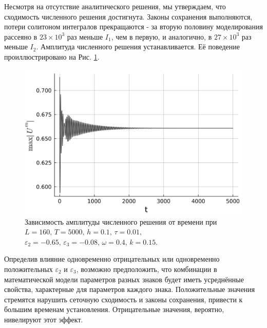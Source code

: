 \documentclass[14pt,a4paper]{extreport}
\begin{document}
			Несмотря на отсутствие аналитического решения, мы утверждаем, что сходимость численного решения достигнута. Законы сохранения выполняются, потери солитоном интегралов прекращаются - за вторую половину моделирования рассеяно в \(23\times10^{3}\) раз меньше \(I_{1}\), чем в первую, и аналогично, в \(27\times10^{3}\) раз меньше \(I_{2}\). Амплитуда численного решения устанавливается. Её поведение проиллюстрировано на Рис. \ref{fig340-9}.

			\begin{figure}[H]
				\begin{center}
					\includegraphics[width=0.6\linewidth]{fig82.png}
				\end{center}
				\caption{Зависимость амплитуды численного решения от времени при
				\(L=160,\, T=5000,\, h=0.1,\, \tau=0.01,\)
				\(\varepsilon_{2}=-0.65,\,\varepsilon_{3}=-0.08,\, \omega=0.4,\, k=0.15\).}
				\label{fig340-9}
			\end{figure}

			Определив влияние одновременно отрицательных или одновременно положительных \(\varepsilon_{2}\) и \(\varepsilon_{3}\), возможно предположить, что комбинации в математической модели параметров разных знаков будет иметь усреднённые свойства, характерные для параметров каждого знака. Положительные значения стремятся нарушить сеточную сходимость и законы сохранения, привести к большим временам установления. Отрицательные значения, вероятно, нивелируют этот эффект.
\end{document}

